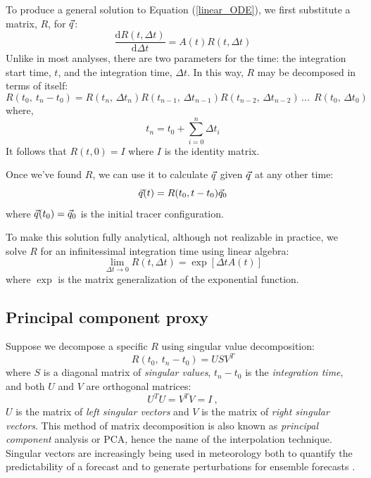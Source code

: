 \documentclass{article}
\begin{document}
To produce a general solution to Equation (\ref{linear_ODE}), 
we first substitute a matrix, $R$, for $\vec q$:
\begin{equation}
	\frac{\mathrm d R(t, \Delta t)}{\mathrm d \Delta t} = A(t) R(t, \Delta t)
\end{equation}
Unlike in most analyses, there are two parameters for the time:
the integration start time, $t$, and the integration time, $\Delta t$.
In this way, $R$ may be decomposed in terms of itself:
\begin{equation}
	R(t_0,~t_n-t_0) = R(t_n, \, \Delta t_n) R(t_{n-1},\,\Delta t_{n-1}) R(t_{n-2},\,\Delta t_{n-2}) \, ...~~ 
	R(t_0,\,\Delta t_0)
\label{matrix_soln_decomposition}
\end{equation}
where,
\begin{equation}
t_n=t_0+\sum_{i=0}^{n} \Delta t_i
\end{equation}
It follows that $R(t, 0)=I$ where $I$ is the identity matrix.

Once we've found $R$, 
we can use it to calculate $\vec q$ given $\vec q$ at any other time:
\begin{equation}
	\vec q(t) = R(t_0, t-t_0) \vec q_0
	\label{tracer_integration}
\end{equation}
where $\vec q(t_0)=\vec q_0$ is the initial tracer configuration.

To make this solution fully analytical, although not realizable in practice,
we solve $R$ for an infinitessimal integration time using linear algebra:
\begin{equation}
	\lim_{\Delta t \rightarrow 0} R(t, \Delta t) = \exp \left [ \Delta t A(t) \right ]
\end{equation}
where $\exp$ is the matrix generalization of the exponential function.

\subsection{Principal component proxy}

Suppose we decompose a specific $R$ using singular value decomposition:
\begin{equation}
	R(t_0, ~ t_n - t_0) = U S V^T
	\label{SVD}
\end{equation}
where $S$ is a diagonal matrix of {\it singular values},
$t_n - t_0$ is the {\it integration time},
and both $U$ and $V$ are orthogonal matrices:
\begin{equation}
	U^T U = V^T V = I~,
\end{equation}
$U$ is the matrix of {\it left singular vectors} and 
$V$ is the matrix of {\it right singular vectors}.
This method of matrix decomposition is also known as {\it principal component}
analysis or PCA, hence the name of the interpolation technique.
Singular vectors are increasingly being used in meteorology both to quantify the
predictability of a forecast and to generate perturbations for ensemble
forecasts \citep{Tang_etal2006}.
\end{document}
